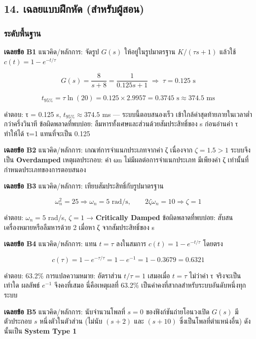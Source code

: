 \newpage

\subsection{14. เฉลยแบบฝึกหัด (สำหรับผู้สอน)}

\subsubsection{ระดับพื้นฐาน}

\textbf{เฉลยข้อ B1}
แนวคิด/หลักการ: จัดรูป $G(s)$ ให้อยู่ในรูปมาตรฐาน $K/(\tau s+1)$ แล้วใช้ $c(t)=1-e^{-t/\tau}$

\[
G(s)=\frac{8}{s+8}=\frac{1}{0.125s+1} \;\Rightarrow\; \tau=0.125 \text{ s}
\]

\[
t_{95\%} = \tau\ln(20) = 0.125\times2.9957 = 0.3745 \text{ s} \approx 374.5 \text{ ms}
\]

คำตอบ: τ = 0.125 s, $t_{95\%}\approx374.5$ ms — ระบบนี้ตอบสนองเร็ว เข้าใกล้ค่าสุดท้ายภายในเวลาต่ำกว่าครึ่งวินาที
ข้อผิดพลาดที่พบบ่อย: ลืมหารทั้งเศษและส่วนด้วยสัมประสิทธิ์ของ s ก่อนอ่านค่า τ ทำให้ได้ τ=1 แทนที่จะเป็น 0.125

\textbf{เฉลยข้อ B2}
แนวคิด/หลักการ: เกณฑ์การจำแนกประเภทจากค่า ζ
เนื่องจาก $\zeta=1.5>1$ ระบบจึงเป็น \textbf{Overdamped}
เหตุผลประกอบ: ค่า ωn ไม่มีผลต่อการจำแนกประเภท มีเพียงค่า ζ เท่านั้นที่กำหนดประเภทของการตอบสนอง

\textbf{เฉลยข้อ B3}
แนวคิด/หลักการ: เทียบสัมประสิทธิ์กับรูปมาตรฐาน

\[
\omega_n^2=25\Rightarrow\omega_n=5 \text{ rad/s}, \qquad 2\zeta\omega_n=10\Rightarrow\zeta=1
\]

คำตอบ: $\omega_n=5$ rad/s, $\zeta=1$ → \textbf{Critically Damped}
ข้อผิดพลาดที่พบบ่อย: สับสนเครื่องหมายหรือลืมหารด้วย 2 เมื่อหา ζ จากสัมประสิทธิ์ของ s

\textbf{เฉลยข้อ B4}
แนวคิด/หลักการ: แทน $t=\tau$ ลงในสมการ $c(t)=1-e^{-t/\tau}$ โดยตรง

\[
c(\tau) = 1-e^{-\tau/\tau} = 1-e^{-1} = 1-0.3679 = 0.6321
\]

คำตอบ: 63.2\% การแปลความหมาย: อัตราส่วน $t/\tau=1$ เสมอเมื่อ $t=\tau$ ไม่ว่าค่า τ จริงจะเป็นเท่าใด ผลลัพธ์ $e^{-1}$ จึงคงที่เสมอ นี่คือเหตุผลที่ 63.2\% เป็นค่าคงที่สากลสำหรับระบบอันดับหนึ่งทุกระบบ

\textbf{เฉลยข้อ B5}
แนวคิด/หลักการ: นับจำนวนโพลที่ $s=0$ ของฟังก์ชันถ่ายโอนวงเปิด
$G(s)$ มีตัวประกอบ $s$ หนึ่งตัวในตัวส่วน (ไม่นับ $(s+2)$ และ $(s+10)$ ซึ่งเป็นโพลที่ตำแหน่งอื่น) ดังนั้นเป็น \textbf{System Type 1}

